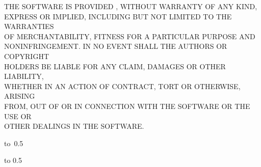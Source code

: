 {
\footnotesize
\vspace{3mm}
\noindent
THE SOFTWARE IS PROVIDED , WITHOUT WARRANTY OF ANY KIND, \\
EXPRESS OR IMPLIED, INCLUDING BUT NOT LIMITED TO THE WARRANTIES \\
OF MERCHANTABILITY, FITNESS FOR A PARTICULAR PURPOSE AND \\
NONINFRINGEMENT. IN NO EVENT SHALL THE AUTHORS OR COPYRIGHT \\
HOLDERS BE LIABLE FOR ANY CLAIM, DAMAGES OR OTHER LIABILITY, \\
WHETHER IN AN ACTION OF CONTRACT, TORT OR OTHERWISE, ARISING \\
FROM, OUT OF OR IN CONNECTION WITH THE SOFTWARE OR THE USE OR \\
OTHER DEALINGS IN THE SOFTWARE.
}

\vspace{15mm}

\hbox{\hbox to 0.5}

\hspace{10cm}

\vspace{20mm}
\newpage


\openright

\noindent
\Podekovani

\newpage


\openright

\vbox to 0.5

\newpage

\openright
\pagestyle{plain}
\setcounter{page}{1}

